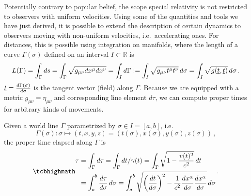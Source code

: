 \documentclass[../relativity_main.tex]{subfiles}
\begin{document}
Potentially contrary to popular belief, the scope special relativity is not restricted to observers with uniform velocities. Using some of the quantities and tools we have just derived, it is possible to extend the description of certain dynamics to observers moving with non-uniform velocities, i.e.~accelerating ones. For distances, this is possible using integration on manifolds, where the length of a curve $\Gamma(\sigma)$ defined on an interval $I \subset \mathbb{R}$ is
\begin{equation}
	L(\Gamma) = \int_\Gamma ds = \int_\Gamma \sqrt{g_{\mu \nu} dx^\mu dx^\nu} = \int_I d\Gamma := \int_I \sqrt{g_{\mu \nu} t^\mu t^\nu} \, d\sigma = \int_I \sqrt{g(\underline{t}, \underline{t})} \, d\sigma \, .
\end{equation}
$\underline{t} = \dv{\Gamma(\sigma)}{\sigma}$ is the tangent vector (field) along $\Gamma$. Because we are equipped with a metric $g_{\mu \nu} = \eta_{\mu \nu}$ and corresponding line element $d\tau$, we can compute proper times for arbitrary kinds of movements.
\begin{post}\label{post:clock_postulate}
	Given a world line $\Gamma$ parametrized by $\sigma \in I = [a, b]$, i.e.
	\begin{equation*}
		\Gamma(\sigma): \sigma \mapsto (t, x, y, z) = (t(\sigma), x(\sigma), y(\sigma), z(\sigma)) \, ,
	\end{equation*}
	the proper time elapsed along $\Gamma$ is
	\begin{equation}\label{eq:proper_time_general}
		\eqbox{
		\begin{split}
		\tau & = \int_\Gamma d\tau = \int_\Gamma dt / \gamma(t) = \int_\Gamma \sqrt{1 - \frac{v(t)^2}{c^2}} \, dt
		\\
		&= \int_a^b \dv{\tau}{\sigma} \, d\sigma = \int_a^b \sqrt{\qty(\dv{t}{\sigma})^2 - \frac{1}{c^2} \dv{x^\alpha}{\sigma} \dv{x^\alpha}{\sigma}} \, d\sigma
		\end{split}
		} \, .
	\end{equation}
\end{post}
\end{document}
